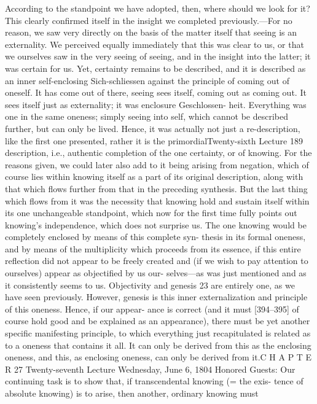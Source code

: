 According to the standpoint we have adopted, then, where should we look for
it? This clearly confirmed itself in the insight we completed previously.—For
no reason, we saw very directly on the basis of the matter itself that seeing is
an externality. We perceived equally immediately that this was clear to us, or
that we ourselves saw in the very seeing of seeing, and in the insight into the
latter; it was certain for us. Yet, certainty remains to be described, and it is
described as an inner self-enclosing {Sich-schliessen} against the principle of
coming out of oneself. It has come out of there, seeing sees itself, coming out
as coming out. It sees itself just as externality; it was enclosure {Geschlossen-
heit}. Everything was one in the same oneness; simply seeing into self, which
cannot be described further, but can only be lived. Hence, it was actually not
just a re-description, like the first one presented, rather it is the primordialTwenty-sixth Lecture
189
description, i.e., authentic completion of the one certainty, or of knowing. For
the reasons given, we could later also add to it being arising from negation,
which of course lies within knowing itself as a part of its original description,
along with that which flows further from that in the preceding synthesis. But
the last thing which flows from it was the necessity that knowing hold and
sustain itself within its one unchangeable standpoint, which now for the first
time fully points out knowing’s independence, which does not surprise us. The
one knowing would be completely enclosed by means of this complete syn-
thesis in its formal oneness, and by means of the multiplicity which proceeds
from its essence, if this entire reflection did not appear to be freely created and
(if we wish to pay attention to ourselves) appear as objectified by us our-
selves—as was just mentioned and as it consistently seems to us. Objectivity
and genesis 23 are entirely one, as we have seen previously. However, genesis is
this inner externalization and principle of this oneness. Hence, if our appear-
ance is correct (and it must [394–395] of course hold good and be explained
as an appearance), there must be yet another specific manifesting principle, to
which everything just recapitulated is related as to a oneness that contains it
all. It can only be derived from this as the enclosing oneness, and this, as
enclosing oneness, can only be derived from it.C H A P T E R
27
Twenty-seventh Lecture
Wednesday, June 6, 1804
Honored Guests:
Our continuing task is to show that, if transcendental knowing (= the exis-
tence of absolute knowing) is to arise, then another, ordinary knowing must
